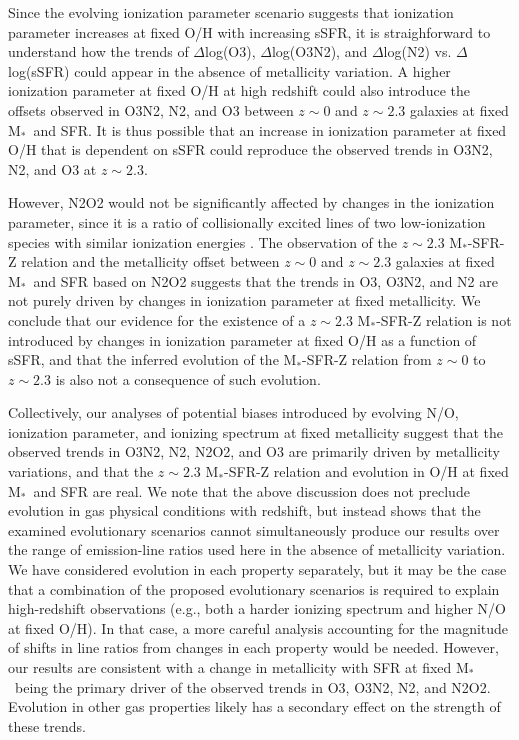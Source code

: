 \documentclass[iop,twocolappendix]{emulateapj}
\newcommand{\mstar}{$\mbox{M}_*$}
\begin{document}
Since the evolving ionization parameter scenario suggests that ionization parameter increases at fixed O/H
 with increasing sSFR, it is straighforward to understand how the trends of $\Delta$log(O3),
 $\Delta$log(O3N2), and $\Delta$log(N2) vs. $\Delta$log(sSFR) could appear in the absence of
 metallicity variation.
  A higher ionization parameter at fixed O/H at high redshift could also introduce the offsets
 observed in O3N2, N2, and O3 between $z\sim0$ and $z\sim2.3$ galaxies at fixed \mstar\ and SFR.
  It is thus possible that an increase in ionization parameter at fixed O/H that is dependent on
 sSFR could reproduce the observed trends in O3N2, N2, and O3 at $z\sim2.3$.

However, N2O2 would not be significantly affected by changes in the ionization parameter,
 since it is a ratio of collisionally excited lines of two low-ionization species with similar ionization
 energies \citep{kew02}.  The observation of the $z\sim2.3$ \mstar-SFR-Z relation and the metallicity offset
 between $z\sim0$ and $z\sim2.3$ galaxies at fixed \mstar\ and SFR based on N2O2 suggests that the
 trends in O3, O3N2, and N2 are not purely driven by changes in ionization parameter at fixed metallicity.
  We conclude that our evidence for the existence of a $z\sim2.3$
 \mstar-SFR-Z relation is not introduced by changes in ionization parameter at fixed O/H as a function of sSFR,
 and that the inferred evolution of the \mstar-SFR-Z relation from $z\sim0$ to $z\sim2.3$ is also not a consequence
 of such evolution.

Collectively, our analyses of potential biases introduced by evolving N/O, ionization parameter, and ionizing spectrum
 at fixed metallicity suggest that the observed trends in O3N2, N2, N2O2, and O3 are primarily driven
 by metallicity variations, and that the $z\sim2.3$ \mstar-SFR-Z relation and evolution in O/H at fixed
 \mstar\ and SFR are real.
  We note that the above discussion does not preclude evolution in gas physical conditions with redshift,
 but instead shows that the examined evolutionary scenarios cannot simultaneously produce our results
 over the range of emission-line ratios used here in the absence of metallicity variation.
  We have considered evolution in each property separately, but it may be the case that a combination of the proposed
 evolutionary scenarios is required to explain high-redshift observations (e.g., both a harder ionizing spectrum
 and higher N/O at fixed O/H).  In that case, a more careful analysis accounting for the magnitude of
 shifts in line ratios from changes in each property would be needed.  However, our results are consistent with
 a change in metallicity with SFR at fixed \mstar\ being the primary driver of the observed trends in
 O3, O3N2, N2, and N2O2.  Evolution in other gas properties likely has a secondary effect on the strength
 of these trends.
\end{document}
